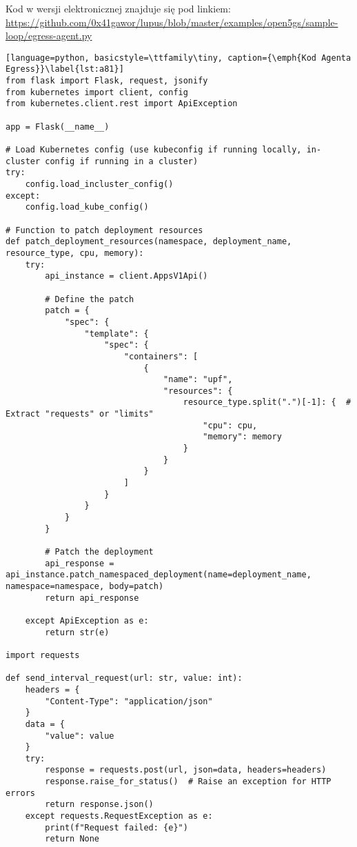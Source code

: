 \hypertarget{appendix:8}{}

Kod w wersji elektronicznej znajduje się pod linkiem: \url{https://github.com/0x41gawor/lupus/blob/master/examples/open5gs/sample-loop/egress-agent.py}

\begin{lstlisting}[language=python, basicstyle=\ttfamily\tiny, caption={\emph{Kod Agenta Egress}}\label{lst:a81}]
from flask import Flask, request, jsonify
from kubernetes import client, config
from kubernetes.client.rest import ApiException

app = Flask(__name__)

# Load Kubernetes config (use kubeconfig if running locally, in-cluster config if running in a cluster)
try:
    config.load_incluster_config()
except:
    config.load_kube_config()

# Function to patch deployment resources
def patch_deployment_resources(namespace, deployment_name, resource_type, cpu, memory):
    try:
        api_instance = client.AppsV1Api()

        # Define the patch
        patch = {
            "spec": {
                "template": {
                    "spec": {
                        "containers": [
                            {
                                "name": "upf",
                                "resources": {
                                    resource_type.split(".")[-1]: {  # Extract "requests" or "limits"
                                        "cpu": cpu,
                                        "memory": memory
                                    }
                                }
                            }
                        ]
                    }
                }
            }
        }

        # Patch the deployment
        api_response = api_instance.patch_namespaced_deployment(name=deployment_name, namespace=namespace, body=patch)
        return api_response

    except ApiException as e:
        return str(e)

import requests

def send_interval_request(url: str, value: int):
    headers = {
        "Content-Type": "application/json"
    }
    data = {
        "value": value
    }
    try:
        response = requests.post(url, json=data, headers=headers)
        response.raise_for_status()  # Raise an exception for HTTP errors
        return response.json()
    except requests.RequestException as e:
        print(f"Request failed: {e}")
        return None




\end{lstlisting}
